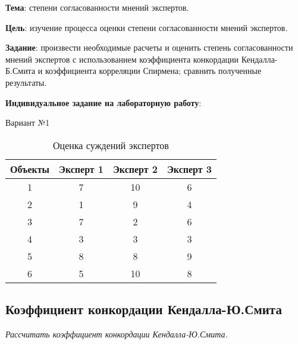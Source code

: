 



\newcommand{\labnumber}{2} %



\usepackage{systeme}
\usepackage{longtable,tabu}
\usepackage{multirow}
\usepackage{array,multirow}
\usepackage{pdflscape}
\usepackage{afterpage}
\usepackage{bm}

\graphicspath{{../figures/}}


\Russian


\addtocounter{page}{1}

\textbf{Тема}: степени согласованности мнений экспертов.

\textbf{Цель}: изучение процесса оценки степени согласованности мнений экспертов.

\textbf{Задание}: произвести необходимые расчеты и оценить степень согласованности мнений экспертов с использованием коэффициента конкордации Кендалла-Б.Смита и коэффициента корреляции Спирмена; сравнить полученные результаты.

\textbf{Индивидуальное задание на лабораторную работу}:

Вариант №1

\begin{table}[H]
	\caption{Оценка суждений экспертов}
	\label{tab:expert_char}
	\begin{tabular}{|c|c|c|c|}
		\hline
		Объекты & Эксперт 1 & Эксперт 2 & Эксперт 3 \\ \hline
		1       & 7         & 10        & 6         \\ \hline
		2       & 1         & 9         & 4         \\ \hline
		3       & 7         & 2         & 6         \\ \hline
		4       & 3         & 3         & 3         \\ \hline
		5       & 8         & 8         & 9         \\ \hline
		6       & 5         & 10        & 8         \\ \hline
	\end{tabular}
\end{table}

\subsection{Коэффициент конкордации Кендалла-Ю.Смита}
{
	\itshape
	Рассчитать коэффициент конкордации Кендалла-Ю.Смита.
}

